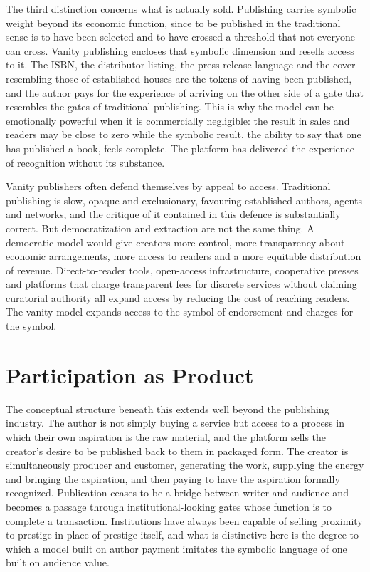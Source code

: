 \documentclass[12pt, a4paper]{article}
\begin{document}
The third distinction concerns what is actually sold. Publishing carries symbolic weight beyond its economic function, since to be published in the traditional sense is to have been selected and to have crossed a threshold that not everyone can cross. Vanity publishing encloses that symbolic dimension and resells access to it. The ISBN, the distributor listing, the press-release language and the cover resembling those of established houses are the tokens of having been published, and the author pays for the experience of arriving on the other side of a gate that resembles the gates of traditional publishing. This is why the model can be emotionally powerful when it is commercially negligible: the result in sales and readers may be close to zero while the symbolic result, the ability to say that one has published a book, feels complete. The platform has delivered the experience of recognition without its substance.

Vanity publishers often defend themselves by appeal to access. Traditional publishing is slow, opaque and exclusionary, favouring established authors, agents and networks, and the critique of it contained in this defence is substantially correct. But democratization and extraction are not the same thing. A democratic model would give creators more control, more transparency about economic arrangements, more access to readers and a more equitable distribution of revenue. Direct-to-reader tools, open-access infrastructure, cooperative presses and platforms that charge transparent fees for discrete services without claiming curatorial authority all expand access by reducing the cost of reaching readers. The vanity model expands access to the symbol of endorsement and charges for the symbol.

\section{Participation as Product}

The conceptual structure beneath this extends well beyond the publishing industry. The author is not simply buying a service but access to a process in which their own aspiration is the raw material, and the platform sells the creator's desire to be published back to them in packaged form. The creator is simultaneously producer and customer, generating the work, supplying the energy and bringing the aspiration, and then paying to have the aspiration formally recognized. Publication ceases to be a bridge between writer and audience and becomes a passage through institutional-looking gates whose function is to complete a transaction. Institutions have always been capable of selling proximity to prestige in place of prestige itself, and what is distinctive here is the degree to which a model built on author payment imitates the symbolic language of one built on audience value.
\end{document}
